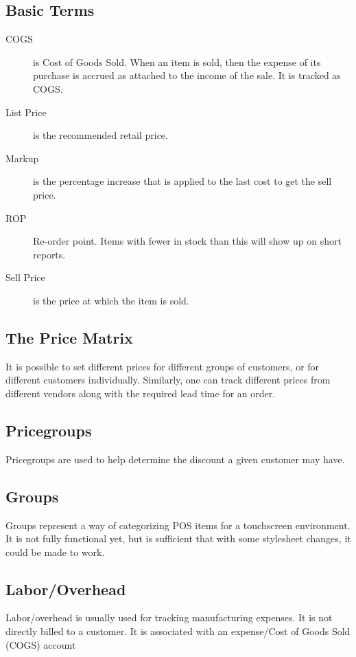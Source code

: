 \documentclass{article}
\begin{document}
\subsection{Basic Terms}
\begin{description}
\item[COGS] is Cost of Goods Sold.  When an item is sold, then the expense of
its purchase is accrued as attached to the income of the sale.  It is tracked as
COGS.
\item[List Price] is the recommended retail price.
\item[Markup] is the percentage increase that is applied to the last cost to get the sell price.
\item[ROP] Re-order point.  Items with fewer in stock than this will show up on
short reports.
\item[Sell Price] is the price at which the item is sold.
\end{description}

\subsection{The Price Matrix}

It is possible to set different prices for different groups of customers, or for
different customers individually.  Similarly, one can track different prices
from different vendors along with the required lead time for an order.

\subsection{Pricegroups}

Pricegroups are used to help determine the discount a given customer may have.

\subsection{Groups}

Groups represent a way of categorizing POS items for a touchscreen environment.
It is not fully functional yet, but is sufficient that with some stylesheet
changes, it could be made to work.

\subsection{Labor/Overhead}

Labor/overhead is usually used for tracking manufacturing expenses.  It is not
directly billed to a customer.  It is associated with an expense/Cost of Goods
Sold (COGS) account 
\end{document}
